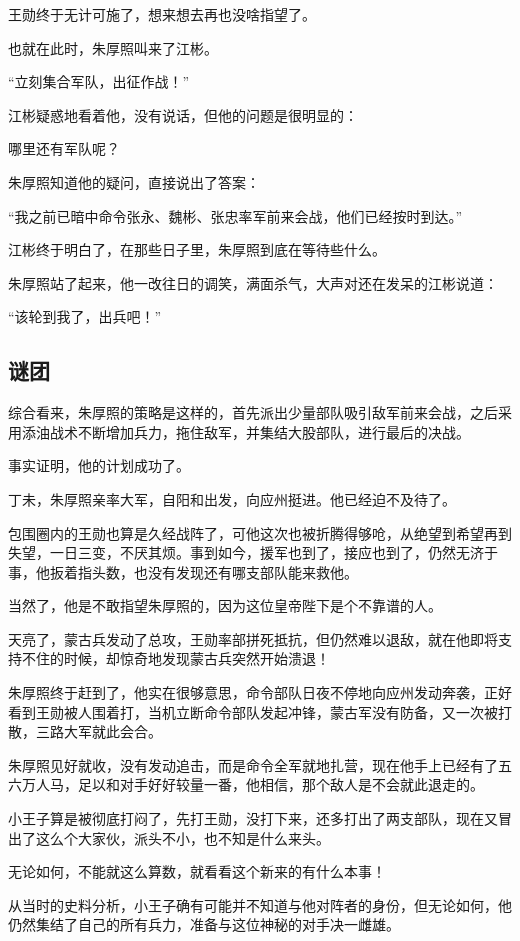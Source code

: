 \begin{multicols}{\theparacolNo}
		王勋终于无计可施了，想来想去再也没啥指望了。

		也就在此时，朱厚照叫来了江彬。

		“立刻集合军队，出征作战！”

		江彬疑惑地看着他，没有说话，但他的问题是很明显的：

		哪里还有军队呢？

		朱厚照知道他的疑问，直接说出了答案：

		“我之前已暗中命令张永、魏彬、张忠率军前来会战，他们已经按时到达。”

		江彬终于明白了，在那些日子里，朱厚照到底在等待些什么。

		朱厚照站了起来，他一改往日的调笑，满面杀气，大声对还在发呆的江彬说道：

		“该轮到我了，出兵吧！”

		\subsection{谜团}
		综合看来，朱厚照的策略是这样的，首先派出少量部队吸引敌军前来会战，之后采用添油战术不断增加兵力，拖住敌军，并集结大股部队，进行最后的决战。

		事实证明，他的计划成功了。

		丁未，朱厚照亲率大军，自阳和出发，向应州挺进。他已经迫不及待了。

		包围圈内的王勋也算是久经战阵了，可他这次也被折腾得够呛，从绝望到希望再到失望，一日三变，不厌其烦。事到如今，援军也到了，接应也到了，仍然无济于事，他扳着指头数，也没有发现还有哪支部队能来救他。

		当然了，他是不敢指望朱厚照的，因为这位皇帝陛下是个不靠谱的人。

		天亮了，蒙古兵发动了总攻，王勋率部拼死抵抗，但仍然难以退敌，就在他即将支持不住的时候，却惊奇地发现蒙古兵突然开始溃退！

		朱厚照终于赶到了，他实在很够意思，命令部队日夜不停地向应州发动奔袭，正好看到王勋被人围着打，当机立断命令部队发起冲锋，蒙古军没有防备，又一次被打散，三路大军就此会合。

		朱厚照见好就收，没有发动追击，而是命令全军就地扎营，现在他手上已经有了五六万人马，足以和对手好好较量一番，他相信，那个敌人是不会就此退走的。

		小王子算是被彻底打闷了，先打王勋，没打下来，还多打出了两支部队，现在又冒出了这么个大家伙，派头不小，也不知是什么来头。

		无论如何，不能就这么算数，就看看这个新来的有什么本事！

		从当时的史料分析，小王子确有可能并不知道与他对阵者的身份，但无论如何，他仍然集结了自己的所有兵力，准备与这位神秘的对手决一雌雄。


\end{multicols}
